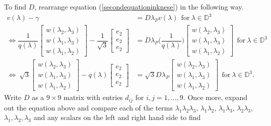 \documentclass[11pt, reqno]{amsart}
\newcommand\1{\boldsymbol {1}}
\numberwithin{equation}{section}
\begin{document}
 To find $D$, rearrange equation (\ref{secondequationinknese}) in the following way.
\begin{align*}
    v(\lambda) - \gamma &= D\lambda_{P}v(\lambda)~~\text{for}~\lambda\in\mathbb{D}^{3}\\
\iff    \dfrac{1}{q(\lambda)}\begin{bmatrix}
    w(\lambda_{2},\lambda_{3})\\
    w(\lambda_{1},\lambda_{3})\\
    w(\lambda_{1},\lambda_{2})
\end{bmatrix} - \dfrac{1}{\sqrt{3}}\begin{bmatrix}
    e_{2}\\
    e_{2}\\
    e_{2}
\end{bmatrix} &= D\lambda_{P}\bigg(\dfrac{1}{q(\lambda)}\bigg)\begin{bmatrix}
    w(\lambda_{2},\lambda_{3})\\
    w(\lambda_{1},\lambda_{3})\\
    w(\lambda_{1},\lambda_{2})
\end{bmatrix}~~\text{for}~\lambda\in\mathbb{D}^{3}\\
\iff~\sqrt{3}\begin{bmatrix}
    w(\lambda_{2},\lambda_{3})\\
    w(\lambda_{1},\lambda_{3})\\
    w(\lambda_{1},\lambda_{2})
\end{bmatrix} - q(\lambda)\begin{bmatrix}
    e_{2}\\
    e_{2}\\
    e_{2}
\end{bmatrix} &= \sqrt{3}D\lambda_{P}\begin{bmatrix}
    w(\lambda_{2},\lambda_{3})\\
    w(\lambda_{1},\lambda_{3})\\
    w(\lambda_{1},\lambda_{2})
\end{bmatrix}~~\text{for}~\lambda\in\mathbb{D}^{3}.
\end{align*}
Write $D$ as a $9\times9$ matrix with entries $d_{ij}$ for $i,j=1,\hdots,9$. Once more, expand out the equation above and compare each of the terms $\lambda_{1}\lambda_{2}\lambda_{3}$, $\lambda_{1}\lambda_{2}$, $\lambda_{1}\lambda_{3}$, $\lambda_{2}\lambda_{3}$, $\lambda_{1},\lambda_{2},\lambda_{3}$ and any scalars on the left and right hand side to find
\end{document}
